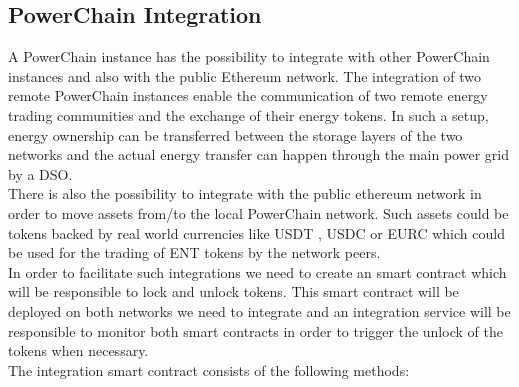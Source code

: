 \subsection{PowerChain Integration} \label{integration}
A PowerChain instance has the possibility to integrate with other PowerChain instances and also with the public Ethereum network. The integration of two remote PowerChain instances enable
the communication of two remote energy trading communities and the exchange of their energy tokens. In such a setup, energy ownership can be transferred between the storage layers of the two
networks and the actual energy transfer can happen through the main power grid by a DSO.\\
There is also the possibility to integrate with the public ethereum network in order to move assets from/to the local PowerChain network. Such assets could be tokens backed by real world currencies
like USDT \cite{Tether}, USDC \cite{CircleUSDC} or EURC \cite{CircleEURC} which could be used for the trading of ENT tokens by the network peers.\\
In order to facilitate such integrations we need to create an smart contract which will be responsible to lock and unlock tokens. This smart contract will be deployed on both networks we need to integrate
and an integration service will be responsible to monitor both smart contracts in order to trigger the unlock of the tokens when necessary.\\
The integration smart contract consists of the following methods:\\
